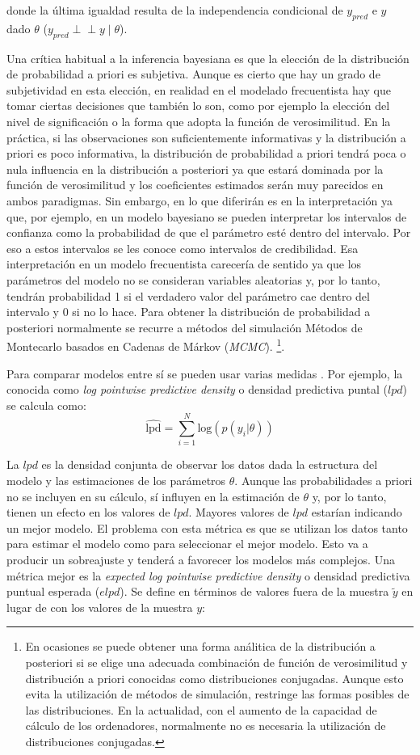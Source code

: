 \documentclass[
  12pt,
  a4paper,
  extrafontsizes,
  onecolumn,
  openright,
  table]{memoir}
\begin{document}
donde la última igualdad resulta de la independencia condicional de
\(y_{pred}\) e \(y\) dado \(\theta\)
(\(y_{pred} \perp\!\!\!\perp y \mid \theta\)).

Una crítica habitual a la inferencia bayesiana es que la elección de la
distribución de probabilidad a priori es subjetiva. Aunque es cierto que
hay un grado de subjetividad en esta elección, en realidad en el
modelado frecuentista hay que tomar ciertas decisiones que también lo
son, como por ejemplo la elección del nivel de significación o la forma
que adopta la función de verosimilitud. En la práctica, si las
observaciones son suficientemente informativas y la distribución a
priori es poco informativa, la distribución de probabilidad a priori
tendrá poca o nula influencia en la distribución a posteriori ya que
estará dominada por la función de verosimilitud y los coeficientes
estimados serán muy parecidos en ambos paradigmas. Sin embargo, en lo
que diferirán es en la interpretación ya que, por ejemplo, en un modelo
bayesiano se pueden interpretar los intervalos de confianza como la
probabilidad de que el parámetro esté dentro del intervalo. Por eso a
estos intervalos se les conoce como intervalos de credibilidad. Esa
interpretación en un modelo frecuentista carecería de sentido ya que los
parámetros del modelo no se consideran variables aleatorias y, por lo
tanto, tendrán probabilidad 1 si el verdadero valor del parámetro cae
dentro del intervalo y 0 si no lo hace. Para obtener la distribución de
probabilidad a posteriori normalmente se recurre a métodos del
simulación Métodos de Montecarlo basados en Cadenas de Márkov
(\emph{\gls{MCMC}}). \footnote{En ocasiones se puede obtener una forma
  análitica de la distribución a posteriori si se elige una adecuada
  combinación de función de verosimilitud y distribución a priori
  conocidas como distribuciones conjugadas. Aunque esto evita la
  utilización de métodos de simulación, restringe las formas posibles de
  las distribuciones. En la actualidad, con el aumento de la capacidad
  de cálculo de los ordenadores, normalmente no es necesaria la
  utilización de distribuciones conjugadas.}.

Para comparar modelos entre sí se pueden usar varias medidas
\autocite[ver][]{barreda2023}. Por ejemplo, la conocida como \emph{log
pointwise predictive density} o densidad predictiva puntal (\(lpd\)) se
calcula como: \[
\widehat{\mathrm{lpd}} = \sum_{i=1}^{N} \mathrm{log} (p(y_{i} | \theta))
\]

La \(lpd\) es la densidad conjunta de observar los datos dada la
estructura del modelo y las estimaciones de los parámetros \(\theta\).
Aunque las probabilidades a priori no se incluyen en su cálculo, sí
influyen en la estimación de \(\theta\) y, por lo tanto, tienen un
efecto en los valores de \(lpd\). Mayores valores de \(lpd\) estarían
indicando un mejor modelo. El problema con esta métrica es que se
utilizan los datos tanto para estimar el modelo como para seleccionar el
mejor modelo. Esto va a producir un sobreajuste y tenderá a favorecer
los modelos más complejos. Una métrica mejor es la \emph{expected log
pointwise predictive density} o densidad predictiva puntual esperada
(\(elpd\)). Se define en términos de valores fuera de la muestra
\(\tilde{y}\) en lugar de con los valores de la muestra \(y\):
\end{document}
